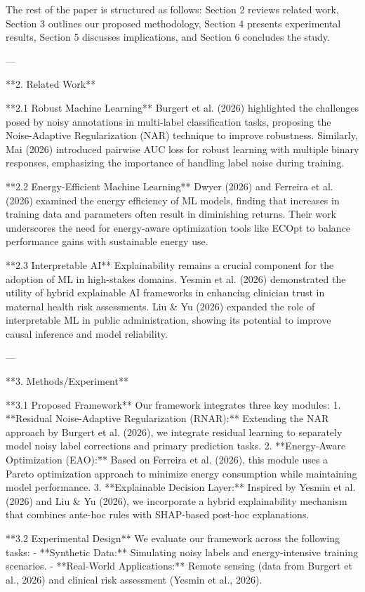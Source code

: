 The rest of the paper is structured as follows: Section 2 reviews related work, Section 3 outlines our proposed methodology, Section 4 presents experimental results, Section 5 discusses implications, and Section 6 concludes the study.

---

**2. Related Work**  

**2.1 Robust Machine Learning**  
Burgert et al. (2026) highlighted the challenges posed by noisy annotations in multi-label classification tasks, proposing the Noise-Adaptive Regularization (NAR) technique to improve robustness. Similarly, Mai (2026) introduced pairwise AUC loss for robust learning with multiple binary responses, emphasizing the importance of handling label noise during training.

**2.2 Energy-Efficient Machine Learning**  
Dwyer (2026) and Ferreira et al. (2026) examined the energy efficiency of ML models, finding that increases in training data and parameters often result in diminishing returns. Their work underscores the need for energy-aware optimization tools like ECOpt to balance performance gains with sustainable energy use.

**2.3 Interpretable AI**  
Explainability remains a crucial component for the adoption of ML in high-stakes domains. Yesmin et al. (2026) demonstrated the utility of hybrid explainable AI frameworks in enhancing clinician trust in maternal health risk assessments. Liu & Yu (2026) expanded the role of interpretable ML in public administration, showing its potential to improve causal inference and model reliability.

---

**3. Methods/Experiment**  

**3.1 Proposed Framework**  
Our framework integrates three key modules:  
1. **Residual Noise-Adaptive Regularization (RNAR):** Extending the NAR approach by Burgert et al. (2026), we integrate residual learning to separately model noisy label corrections and primary prediction tasks.  
2. **Energy-Aware Optimization (EAO):** Based on Ferreira et al. (2026), this module uses a Pareto optimization approach to minimize energy consumption while maintaining model performance.  
3. **Explainable Decision Layer:** Inspired by Yesmin et al. (2026) and Liu & Yu (2026), we incorporate a hybrid explainability mechanism that combines ante-hoc rules with SHAP-based post-hoc explanations.

**3.2 Experimental Design**  
We evaluate our framework across the following tasks:  
- **Synthetic Data:** Simulating noisy labels and energy-intensive training scenarios.  
- **Real-World Applications:** Remote sensing (data from Burgert et al., 2026) and clinical risk assessment (Yesmin et al., 2026).  

